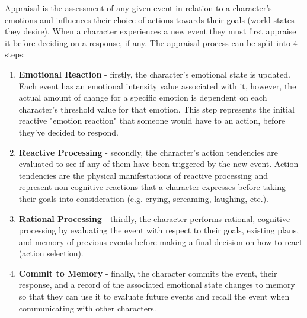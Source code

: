 \documentclass{sig-alternate-05-2015}
\begin{document}
Appraisal is the assessment of any given event in relation to a character's emotions and influences their choice of actions towards their goals (world states they desire). When a character experiences a new event they must first appraise it before deciding on a response, if any. The appraisal process can be split into 4 steps:
\begin{enumerate}
	\item \textbf{Emotional Reaction} - firstly, the character's emotional state is updated. Each event has an emotional intensity value associated with it, however, the actual amount of change for a specific emotion is dependent on each character's threshold value for that emotion. This step represents the initial reactive "emotion reaction" that someone would have to an action, before they've decided to respond.
	\item \textbf{Reactive Processing} - secondly, the character's action tendencies are evaluated to see if any of them have been triggered by the new event. Action tendencies are the physical manifestations of reactive processing and represent non-cognitive reactions that a character expresses before taking their goals into consideration (e.g. crying, screaming, laughing, etc.).
	\item \textbf{Rational Processing} - thirdly, the character performs rational, cognitive processing by evaluating the event with respect to their goals, existing plans, and memory of previous events before making a final decision on how to react (action selection).
	\item \textbf{Commit to Memory} - finally, the character commits the event, their response, and a record of the associated emotional state changes to memory so that they can use it to evaluate future events and recall the event when communicating with other characters.
\end{enumerate}
\end{document}
